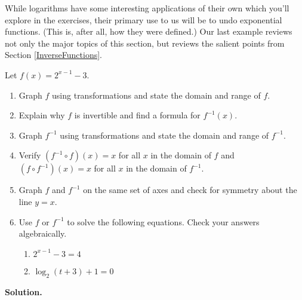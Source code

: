 \documentclass{ximera}
\begin{document}
While logarithms have some interesting applications of their own which you'll explore in the exercises, their primary use to us will be to undo exponential functions. (This is, after all, how they were defined.)  Our last example  reviews not only the major topics of this section, but reviews the salient points from Section \ref{InverseFunctions}.

\newpage

\begin{example}  Let $f(x) = 2^{x-1} - 3$. \label{proceduralinverse}

\begin{enumerate}

\item  Graph $f$ using transformations and state the domain and range of $f$.

\item  Explain why $f$ is invertible and find a formula for $f^{-1}(x)$.

\item  Graph $f^{-1}$ using transformations and state the domain and range of $f^{-1}$.

\item  Verify $\left(f^{-1} \circ f\right)(x) = x$ for all $x$ in the domain of $f$ and  $\left(f \circ f^{-1} \right)(x) = x$ for all $x$ in the domain of $f^{-1}$.

\item  Graph $f$ and $f^{-1}$ on the same set of axes and check for symmetry about the line $y = x$.

\item  Use $f$ or $f^{-1}$ to solve the following equations.  Check your answers algebraically.

\begin{multicols}{2}

\begin{enumerate}

\item  $2^{x-1} - 3 = 4$

\item  $\log_{2}(t+3)+1 = 0$

\end{enumerate}

\end{multicols}

\end{enumerate}

{\bf Solution.}  

\begin{enumerate}


\end{enumerate}
\end{example}
\end{document}

